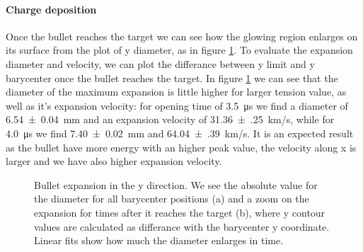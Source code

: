 \paragraph{Charge deposition}
Once the bullet reaches the target we can see how the glowing region enlarges on its surface from the plot of y diameter, as in figure \ref{fig:elio_c_ylim}. To evaluate the expansion diameter and velocity, we can plot the differance between y limit and y barycenter once the bullet reaches the target. In figure \ref{fig:elio_c_ylim} we can see that the diameter of the maximum expansion is little higher for larger tension value, as well as it's expansion velocity: for opening time of \SI{3.5}{\micro\second} we find a diameter of \SI{6.54(4)}{\milli\meter} and an expansion velocity of \SI{31.36(25)}{\kilo\meter/\second}, while for \SI{4.0}{\micro\second} we find \SI{7.40(2)}{\milli\meter} and \SI{64.04(39)}{\kilo\meter/\second}. It is an expected result as the bullet have more energy with an higher peak value, the velocity along x is larger and we have also higher expansion velocity.

\begin{figure}
 \centering
 \hfill
 \caption{Bullet expansion in the y direction. We see the absolute value for the diameter for all barycenter positions (a) and a zoom on the expansion for times after it reaches the target (b), where y contour values are calculated as differance with the barycenter y coordinate. Linear fits show how much the diameter enlarges in time.}
 \label{fig:elio_c_ylim}
\end{figure}


